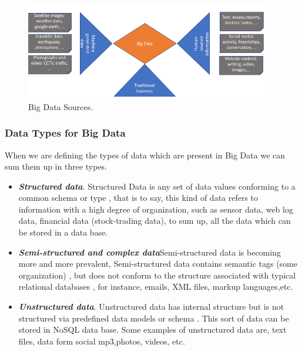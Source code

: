 \begin{figure}[H] %
\label{fig:bigdatasources}
	\vspace{0.5cm} \centering \includegraphics[width=0.95\textwidth]{figures/bigData/BigData_Classification.png}
	\caption{Big Data Sources.}\vspace{0.5cm}
\end{figure}

\subsubsection{Data Types for Big Data}

When we are defining the types of data which are present in Big Data we can sum them up in three types.

\begin{itemize}
\item \textbf{\textit{Structured data}}. Structured Data is any set of data values conforming to a common schema or type \cite{arasu2003extracting}, that is to say, this kind of data refers to information with a high degree of organization, such as sensor data, web log data, financial data (stock-trading data), to sum up, all the data which can be stored in a data base.
\item \textbf{\textit{Semi-structured and complex data}}Semi-structured data is becoming more and more prevalent, Semi-structured data contains semantic tags (some organization) , but does not conform to the structure associated with typical relational databases \cite{buneman1997semistructured}, for instance, emails, XML files, markup languages,etc.
\item \textbf{\textit{Unstructured data}}. Unstructured data has internal structure but is not structured via predefined data models or schema \cite{baars2008management}. This sort of data can be stored in NoSQL data base. Some examples of unstructured data are, text files, data form social mp3,photos, videos, etc.
\end{itemize}


